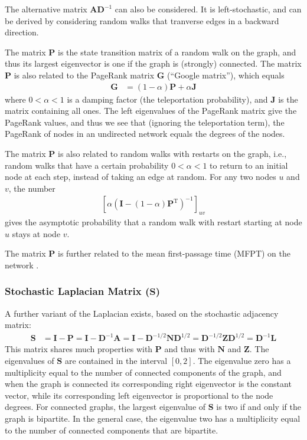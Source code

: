 \documentclass{article}
\begin{document}
The alternative matrix $\mathbf A \mathbf D^{-1}$ can also be
considered.  It is left-stochastic, and
can be derived by considering random walks that tranverse edges in a
backward direction. 

The matrix $\mathbf P$ is the state transition matrix of a random walk
on the graph, and thus its largest eigenvector is one if the graph is
(strongly) connected.  
The matrix $\mathbf P$ is also related to the PageRank matrix $\mathbf
G$ (``Google matrix''), which
equals 
\begin{align*}
  \mathbf G &= (1-\alpha) \mathbf P + \alpha\mathbf J
\end{align*}
where $0 < \alpha < 1$ is a damping factor (the teleportation
probability), and $\mathbf J$ is the matrix containing all ones.  The
left 
eigenvalues of the PageRank matrix give the PageRank values, and thus
we see that (ignoring the teleportation term), the PageRank of nodes in
an undirected network equals the degrees of the nodes. 

The matrix $\mathbf P$ is also related to random walks with restarts on
the graph, i.e., random walks that have a certain probability $0 <
\alpha < 1$
to return to an initial node at each step, instead of taking an edge at
random.  For any two nodes $u$ and $v$, the number
\begin{align}
  \left[\alpha  (\mathbf I - (1-\alpha) \mathbf P^{\mathrm T})^{-1}\right]_{uv}
\end{align}
gives the asymptotic probability that a random walk with restart starting at node $u$
stays at node $v$.  

The matrix $\mathbf P$ is further related to the mean first-passage time
(MFPT) on the network \citep{b880}.

\subsubsection{Stochastic Laplacian Matrix ($\mathbf S$)}
A further variant of the Laplacian exists, based on the stochastic
adjacency matrix:
\begin{align*}
  \mathbf S &= \mathbf I - \mathbf P = \mathbf I - \mathbf D^{-1}
  \mathbf A = \mathbf I - \mathbf D^{-1/2} \mathbf N \mathbf D^{1/2} =
  \mathbf D^{-1/2} \mathbf Z \mathbf D^{1/2}
  = \mathbf D^{-1} \mathbf L
\end{align*}
This matrix shares much properties with $\mathbf P$ and thus with
$\mathbf N$ and $\mathbf Z$.  The eigenvalues of $\mathbf S$ are
contained in the interval $[0, 2]$.  The eigenvalue zero has a
multiplicity equal to the number of connected components of the graph,
and when the graph is connected its corresponding right eigenvector is the
constant vector, while its corresponding left eigenvector is
proportional to the node degrees.  For connected graphs, the largest
eigenvalue of $\mathbf S$ is two if and only if the graph is bipartite.
In the general case, the eigenvalue two has a multiplicity equal to the
number of connected components that are bipartite. 
\end{document}
